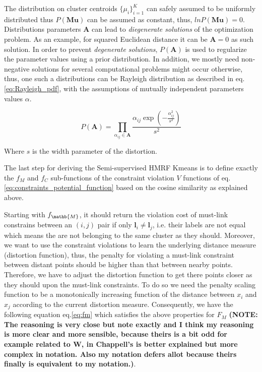\documentclass[dvips,dvipdfm,pdftex]{llncs}
\begin{document}
The distribution on cluster centroids $\{\mu_{i}\}_{i=1}^{K}$ can safely assumed to be uniformly distributed thus $P(\mathbf{Mu})$ can be assumed as constant, thus, $lnP(\mathbf{Mu})=0$. Distributions parameters $\mathbf{A}$ can lead to \emph{diegenerate solutions} of the optimization problem. As an example, for squared Euclidean distance it can be $\mathbf{A}=0$ as such solution. In order to prevent \emph{degenerate solutions}, $P(\mathbf{A})$ is used to regularize the parameter values using a prior distribution. In addition, we mostly need non-negative solutions for several computational problems might occur otherwise, thus, one such a distributions can be Rayleigh distribution as described in eq.\ref{eq:Rayleigh_pdf}, with the assumptions of mutually independent parameters values $\alpha$.

\begin{equation}
	P(\mathbf{A})=\prod_{\alpha_{ij}\in\mathbf{A}}\frac{\alpha_{ij}\exp(-\frac{\alpha_{ij}^{2}}{s^{2}})}{s^{2}}
\label{eq:Rayleigh_pdf}
\end{equation}

Where $s$ is the width parameter of the distortion.

The last step for deriving the Semi-supervised HMRF Kmeans is to define exactly the $f_{M}$ and $f_{C}$ sub-functions of the constraint violation $V$ functions of eq.\ref{eq:constraints_potential_function} based on the cosine similarity as explained above.

Starting with $f_{\mathb{M}}$, it should return the violation cost of must-link constrains between an $(i,j)$ pair if only $\mathbf{l}_{i} \neq \mathbf{l}_{j}$, i.e. their labels are not equal which means the are not belonging to the same cluster as they should. Moreover, we want to use the constraint violations to learn the underlying distance measure (distortion function), thus, the penalty for violating a must-link constraint between distant points should be higher than that between nearby points. Therefore, we have to adjust the distortion function to get there points closer as they should upon the must-link constraints. To do so we need the penalty scaling function to be a
monotonically increasing function of the distance between $x_i$ and $x_j$ according to the current distortion measure. Consequently, we have the following equation eq.\ref{eq:fm} which satisfies the above properties for $F_{M}$ \cite{basu2004probabilistic,chapelle2006semi_hmrf_kmeans} \textbf{(NOTE: The reasoning is very close but note exactly and I think my reasoning is more clear and more sensible, because theirs is a bit odd for example related to W, in Chappell's is better explained but more complex in notation. Also my notation defers allot because theirs finally is equivalent to my notation.)}.
\end{document}
